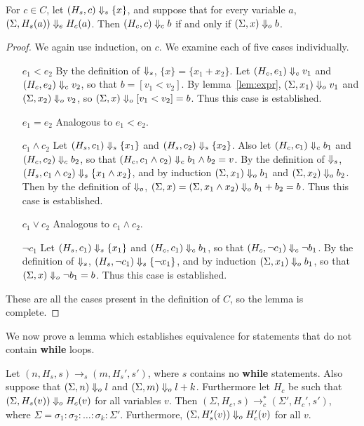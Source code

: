 \begin{lemma} \label{lem:cond}
  For $c \in C$, let $(H_s, c) \Downarrow_s \{ x \}$, and suppose that for
  every variable $a$, $(\Sigma, H_s(a)) \Downarrow_e H_c(a)$.  Then $(H_c,
  c) \Downarrow_c b$ if and only if $(\Sigma, x) \Downarrow_o b$.
\end{lemma}

\begin{proof}
We again use induction, on $c$.  We examine each of five cases
individually.

\begin{itemize}
\item[$e_1 < e_2$] By the definition of $\Downarrow_s$, $\{ x \} = \{ x_1
  + x_2 \}$.  Let $(H_c, e_1) \Downarrow_c v_1$ and $(H_c, e_2) \Downarrow_c
  v_2$, so that $b = [v_1 < v_2]$.  By lemma~\ref{lem:expr}, $(\Sigma,
  x_1) \Downarrow_o v_1$ and $(\Sigma, x_2) \Downarrow_o v_2$, so $(\Sigma, x)
  \Downarrow_o [v_1 < v_2] = b$.  Thus this case is established.
\item[$e_1 = e_2$] Analogous to $e_1 < e_2$.
\item[$c_1 \wedge c_2$] Let $(H_s, c_1) \Downarrow_s \{ x_1 \}$ and $(H_s,
  c_2) \Downarrow_s \{ x_2 \}$. Also let $(H_c, c_1) \Downarrow_c b_1$ and
  $(H_c, c_2) \Downarrow_c b_2$, so that $(H_c, c_1 \wedge c_2) \Downarrow_c
  b_1 \wedge b_2 = v$.  By the definition of $\Downarrow_s$, $(H_s, c_1
  \wedge c_2) \Downarrow_s \{ x_1 \wedge x_2 \}$, and by induction
  $(\Sigma, x_1) \Downarrow_o b_1$ and $(\Sigma, x_2) \Downarrow_o b_2$.  Then
  by the definition of $\Downarrow_o$, $(\Sigma, x) = (\Sigma, x_1 \wedge
  x_2) \Downarrow_o b_1 + b_2 = b$.  Thus this case is established.
\item[$c_1 \vee c_2$] Analogous to $c_1 \wedge c_2$.
\item[$\neg c_1$] Let $(H_s, c_1) \Downarrow_s \{ x_1 \}$ and $(H_c, c_1)
  \Downarrow_c b_1$, so that $(H_c, \neg c_1) \Downarrow_c \neg b_1$.  By the
  definition of $\Downarrow_s$, $(H_s, \neg c_1) \Downarrow_s \{ \neg x_1 \}$,
  and by induction $(\Sigma, x_1) \Downarrow_o b_1$, so that $(\Sigma, x)
  \Downarrow_o \neg b_1 = b$.  Thus this case is established.
\end{itemize}

These are all the cases present in the definition of $C$, so the lemma
is complete.

\end{proof}

We now prove a lemma which establishes equivalence for statements that
do not contain \textbf{while} loops.

\begin{lemma}
  \label{lem:stmt}
  Let
  $(n, H_s, s) \to_s (m, H_s', s')$,
  where $s$ contains no \textbf{while} statements.
  Also suppose that $(\Sigma, n) \Downarrow_o l$
  and $(\Sigma, m) \Downarrow_o l + k$.
  Furthermore let $H_c$ be such that
  $(\Sigma, H_s(v)) \Downarrow_o H_c(v)$
  for all variables $v$. Then
  $(\Sigma, H_c, s) \to_c^* (\Sigma', H_c', s')$,
  where
  $\Sigma = \sigma_1:\sigma_2:\dots:\sigma_k:\Sigma'$.
  Furthermore,
  $(\Sigma, H_s'(v)) \Downarrow_o H_c'(v)$
  for all $v$.
\end{lemma}

